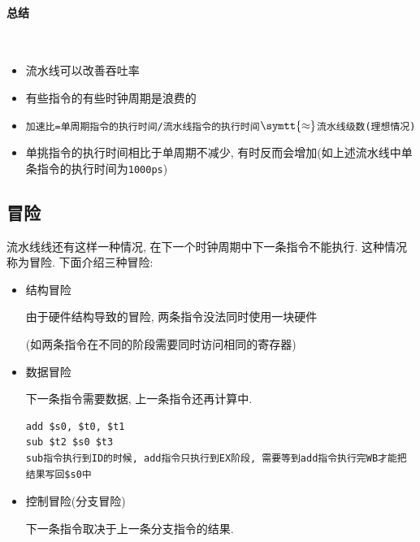 \paragraph{总结}~{} 
\begin{itemize}
\item 流水线可以改善吞吐率
\item 有些指令的有些时钟周期是浪费的
\item \verb|加速比=单周期指令的执行时间/流水线指令的执行时间|$ \symtt{\approx} $\verb|流水线级数(理想情况)|
\item 单挑指令的执行时间相比于单周期不减少, 有时反而会增加(如上述流水线中单条指令的执行时间为\verb|1000ps|)
\end{itemize}
\subsection{冒险}
流水线线还有这样一种情况, 在下一个时钟周期中下一条指令不能执行. 这种情况称为冒险. 下面介绍三种冒险:
\begin{itemize}
\item 结构冒险 \par 由于硬件结构导致的冒险, 两条指令没法同时使用一块硬件 \par (如两条指令在不同的阶段需要同时访问相同的寄存器)
\item 数据冒险 \par 下一条指令需要数据, 上一条指令还再计算中.
\begin{lstlisting}
add $s0, $t0, $t1
sub $t2 $s0 $t3
sub指令执行到ID的时候, add指令只执行到EX阶段, 需要等到add指令执行完WB才能把结果写回$s0中
\end{lstlisting}
\item 控制冒险(分支冒险) \par 下一条指令取决于上一条分支指令的结果.
\end{itemize}\par
